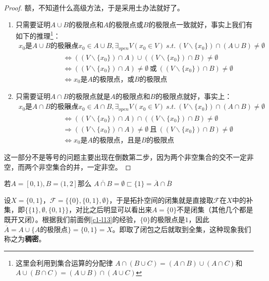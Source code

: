 \documentclass[lang=cn,10pt,device=pad]{elegantbook}
\newcommand{\tp}{\mathscr{F}}
\newcommand{\st}{~s.t.~}
\newcommand{\dkh}[1]{\{#1\}}
\newcommand{\xkh}[1]{\left(#1\right)}
\newcommand{\chadiao}{\backslash}
\begin{document}
\begin{proof}
	额，不知道什么高级方法，于是采用土办法就好了。
	\begin{enumerate}
		\item  只需要证明$A\cup B$的极限点和$A$的极限点或$B$的极限点一致就好，事实上我们有如下的推理\footnote{这里会利用到集合运算的分配律 $A\cap (B\cup C) = (A\cap B)\cup(A\cap C)$和$A\cup (B\cap C) = (A\cup B)\cap(A\cup C)$}：
		\begin{equation*}
			\begin{aligned}
				x_{0}\text{是}A\cup B\text{的极限点}&\iff \forall x_{0}\in A\cup B , \exists_{open}V(x_{0}\in V) \st (V\chadiao\dkh{x_{0}})\cap (A\cup B)\neq \emptyset\\
				&\iff \xkh{(V\chadiao\dkh{x_{0}})\cap A}\cup \xkh{(V\chadiao\dkh{x_{0}})\cap B} \neq \emptyset\\
				&\iff \xkh{(V\chadiao\dkh{x_{0}})\cap A}\neq \emptyset~\text{或}~\xkh{(V\chadiao\dkh{x_{0}})\cap B}\neq \emptyset\\
				&\iff x_{0}\text{是}A\text{的极限点，或}B\text{的极限点}
			\end{aligned}
		\end{equation*}
		\item 只需要证明$A\cap B$的极限点就是$A$的极限点和$B$的极限点就好，事实上：
		\begin{equation*}
			\begin{aligned}
				x_{0}\text{是}A\cap B\text{的极限点}&\iff \forall x_{0}\in A\cap B , \exists_{open}V(x_{0}\in V) \st (V\chadiao\dkh{x_{0}})\cap (A\cap B)\neq \emptyset\\
				&\iff \xkh{(V\chadiao\dkh{x_{0}})\cap A}\cap \xkh{(V\chadiao\dkh{x_{0}})\cap B} \neq \emptyset\\
				&\Longrightarrow \xkh{(V\chadiao\dkh{x_{0}})\cap A}\neq \emptyset~\text{且}~\xkh{(V\chadiao\dkh{x_{0}})\cap B}\neq \emptyset\\
				&\iff x_{0}\text{是}A\text{的极限点，且是}B\text{的极限点}
			\end{aligned}
		\end{equation*}
	\end{enumerate}
	这一部分不是等号的问题主要出现在倒数第二步，因为两个非空集合的交不一定非空，而两个非空集合的并，一定非空。
\end{proof}
\begin{example}[上命题第二部分不能取等]
若$A = [0,1) , B = (1,2]$那么	$\overline{A\cap B}  = \emptyset \sqsubset  \dkh{1} = \overline{A}\cap \overline{B}  $
\end{example}
\begin{example}[单点集不一定是闭集，稠密]
	设$X=\dkh{0,1}$，$\tp =\dkh{\dkh{0},\dkh{0,1},\emptyset}$，于是拓扑空间的闭集就是直接取$\tp$在$X$中的补集，即$\dkh{\dkh{1},\emptyset,\dkh{0,1}}$，对比之后明显可以看出来$A = \dkh{0}$不是闭集（其他几个都是既开又闭）。根据我们前面例\ref{c1-l13}的经验，$\dkh{0}$的极限点是$1$，因此$\overline{A} = A\cup \dkh{A\text{的极限点}} = \dkh{0,1} = X$。即取了闭包之后就取到全集，这种现象我们称之为\textbf{稠密}。
\end{example}
\end{document}
